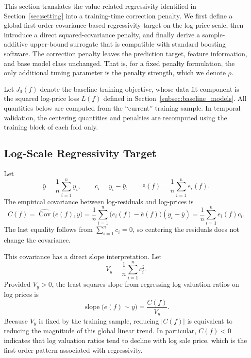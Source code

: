\documentclass[10pt]{article}
\theoremstyle{definition}
\newcommand{\1}{\mathbf{1}}
\begin{document}
{This section translates the value-related regressivity identified in Section~\ref{sec:setting} into a training-time correction penalty. We first define a global first-order covariance-based regressivity target on the log-price scale, then introduce a direct squared-covariance penalty, and finally derive a sample-additive upper-bound surrogate that is compatible with standard boosting software. The correction penalty leaves the prediction target, feature information, and base model class unchanged. That is, for a fixed penalty formulation, the only additional tuning parameter is the penalty strength, which we denote $\rho$.}

{Let $J_0(f)$ denote the baseline training objective, whose data-fit component is the squared log-price loss $L(f)$ defined in Section~\ref{subsec:baseline_models}. All quantities below are computed from the ``current'' training sample. In temporal validation, the centering quantities and penalties are recomputed using the training block of each fold only.}


\subsection{{Log-Scale Regressivity Target}}
\label{subsec:training_regressivity}

Let
\begin{equation}
\label{eq:centered_log_price}
\bar y=\frac{1}{n}\sum_{i=1}^n y_i,
\qquad
c_i=y_i-\bar y,
\qquad
\bar e(f)=\frac{1}{n}\sum_{i=1}^n e_i(f).
\end{equation}
The empirical covariance between log-residuals and log-prices is
\begin{equation}
\label{eq:training_covariance}
C(f)
=
\widehat{\operatorname{Cov}}\bigl(e(f),y\bigr)
=
\frac{1}{n}\sum_{i=1}^n
\bigl(e_i(f)-\bar e(f)\bigr)(y_i-\bar y)
=
\frac{1}{n}\sum_{i=1}^n e_i(f)c_i.
\end{equation}
The last equality follows from $\sum_{i=1}^n c_i=0$, so centering the residuals does not change the covariance.

This covariance has a direct slope interpretation. Let
\[
V_y=\frac{1}{n}\sum_{i=1}^n c_i^2.
\]
Provided $V_y>0$, the least-squares slope from regressing log valuation ratios on log prices is
\begin{equation}
\label{eq:covariance_slope}
\operatorname{slope}\bigl(e(f)\sim y\bigr)
=
\frac{C(f)}{V_y}.
\end{equation}
Because $V_y$ is fixed by the training sample, reducing $|C(f)|$ is equivalent to reducing the magnitude of this global linear trend. In particular, $C(f)<0$ indicates that log valuation ratios tend to decline with log sale price, which is the first-order pattern associated with regressivity.
\end{document}
